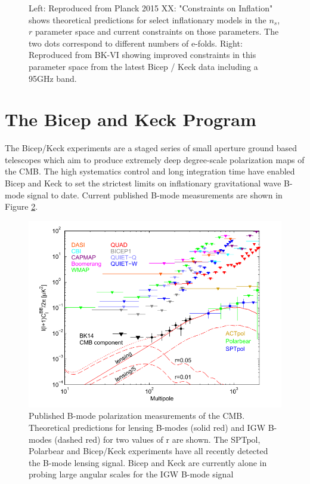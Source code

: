 \documentclass[12pt]{article}
\begin{document}
\begin{figure}

	\caption{Left: Reproduced from Planck 2015 XX: "Constraints on
	Inflation"\cite{PlanckXX}
	shows theoretical predictions for select inflationary models in
	the $n_s$,$r$ parameter space and current constraints on those
	parameters. The two dots correspond to different numbers of e-folds.
	Right: Reproduced from BK-VI \cite{BK6} showing improved constraints in this
	parameter space from the latest Bicep / Keck data including a 95GHz band.}
	\label{fig:status}
\end{figure}


\section{The Bicep and Keck Program}
The Bicep/Keck experiments are a staged series of small aperture ground based
telescopes which aim to produce extremely deep degree-scale polarization maps
of the CMB. The high systematics control and long integration time have
enabled Bicep and Keck to set the strictest limits on inflationary
gravitational wave B-mode signal to date. Current published B-mode
measurements are shown in Figure \ref{fig:BK_vs_world}.

\begin{figure}
	\center
	\includegraphics[width=.7\textwidth]{BK_vs_world.png}
	\caption{Published B-mode polarization measurements of the CMB.
	Theoretical predictions for lensing B-modes (solid red) and IGW B-modes
	(dashed red) for two values of r are shown. The SPTpol, Polarbear and
	Bicep/Keck experiments have all recently detected the B-mode lensing
	signal. Bicep and Keck are currently alone in probing large
	angular scales for the IGW B-mode signal}
	\label{fig:BK_vs_world}
\end{figure}
\end{document}
